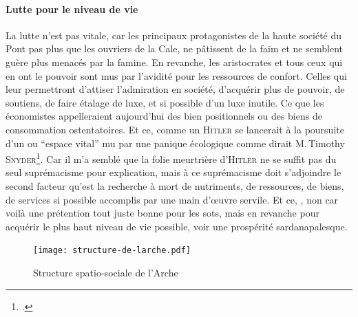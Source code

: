 \paragraph{Lutte pour le niveau de vie}
La lutte n’est pas vitale, car les principaux protagonistes de la haute société du Pont pas plus que les ouvriers de la Cale, ne pâtissent de  la faim et ne semblent guère plus menacés par la famine. En revanche, les aristocrates et tous ceux qui en ont le pouvoir sont mus par l’avidité pour les ressources de confort. Celles qui leur permettront d’attiser l’admiration en société, d’acquérir plus de pouvoir, de soutiens, de faire étalage de luxe, et si possible d’un luxe inutile. Ce que les économistes appelleraient aujourd’hui des bien positionnels ou des biens de consommation ostentatoires. Et ce, comme un \textsc{Hitler} se lancerait à la poursuite d’un  ou \enquote{espace vital} mu par une panique écologique comme dirait M.\,Timothy \textsc{Snyder}\footcite{timothySnyder2016Gallimard-TerreNoire}. Car il m’a semblé que la folie meurtrière d’\textsc{Hitler} ne se suffit pas du seul suprémacisme pour explication, mais à ce suprémacisme  doit s’adjoindre le second facteur qu’est la recherche à mort de nutriments, de ressources, de biens, de services si possible accomplis par une main d’œuvre servile. Et ce, , non car voilà une prétention tout juste bonne pour les sots, mais en revanche pour acquérir le plus haut niveau de vie possible, voir une prospérité sardanapalesque.


\begin{figure}[h]
	\centering
	\texttt{[image: structure-de-larche.pdf]}
	\caption{Structure spatio-sociale de l’Arche}
    \label{fig:structure-spatio-sociale-arche}
\end{figure}

